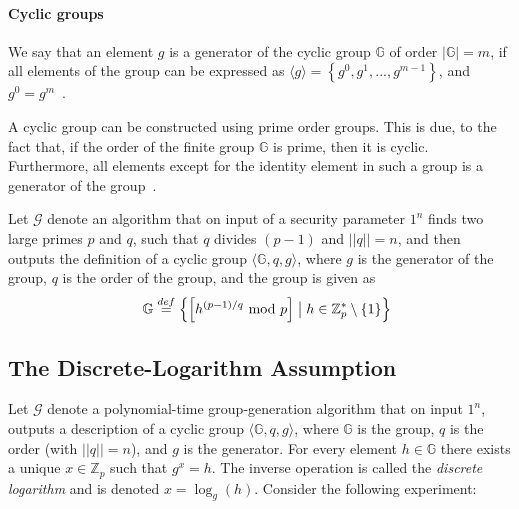 \paragraph{Cyclic groups}\label{par:cyclic}
We say that an element $g$ is a generator of the cyclic group $\mathbb{G}$ of order $\lvert \mathbb{G} \rvert = m$, if all elements of the group can be expressed as $\langle g \rangle = \left\{ g^0, g^1,...,g^{m-1} \right\}$, and $g^0 = g^m$~\cite[page 316]{katz2014introduction}.

A cyclic group can be constructed using prime order groups. This is due, to the fact that, if the order of the finite group $\mathbb{G}$ is prime, then it is cyclic. Furthermore, all elements except for the identity element in such a group is a generator of the group~\cite[page 321]{katz2014introduction}.

\begin{definition}
Let $\mathcal{G}$ denote an algorithm that on input of a security parameter $1^n$ finds two large primes $p$ and $q$, such that $q$ divides $(p-1)$ and $\lvert\lvert q \rvert\rvert = n$, and then outputs the definition of a cyclic group $\langle \mathbb{G}, q, g \rangle$, where $g$ is the generator of the group, $q$ is the order of the group, and the group is given as
{\setlength{\mathindent}{0cm}
\begin{align*}
&&   \mathbb{G} \stackrel{def}{=} \left\{ \left[ h^{(p-1)/q} ~\mathrm{mod}~p \right] \bigm\vert h \in \mathbb{Z}^*_p \setminus \left\{1\right\} \right\}
\end{align*}}
\end{definition}




\subsection{The Discrete-Logarithm Assumption}
Let $\mathcal{G}$ denote a polynomial-time group-generation algorithm  that on input $1^n$, outputs a description of a cyclic group $\langle \mathbb{G}, q, g \rangle$, where $\mathbb{G}$ is the group, $q$ is the order (with $\lvert\lvert q \rvert \rvert = n$), and $g$ is the generator. For every element $h \in \mathbb{G}$ there exists a unique $x \in \mathbb{Z}_p$  such that $g^x = h$. The inverse operation is called the \textit{discrete logarithm} and is denoted $x = \log_g(h)$. Consider the following experiment:~\cite[page 320]{katz2014introduction}

